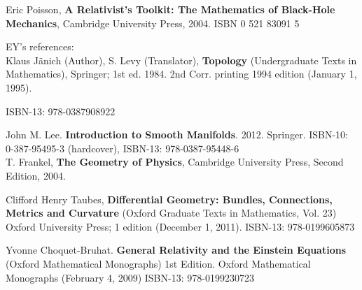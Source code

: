 \documentclass[10pt, twoside]{amsart}
\begin{document}
\begin{thebibliography}{9}
Eric Poisson, 
\textbf{A Relativist's Toolkit: The Mathematics of Black-Hole Mechanics},
Cambridge University Press, 
2004.
ISBN 0 521 83091 5

EY's references: \\

Klaus Jänich (Author), S. Levy (Translator), \textbf{Topology} (Undergraduate Texts in Mathematics), Springer; 1st ed. 1984. 2nd Corr. printing 1994 edition (January 1, 1995).

ISBN-13: 978-0387908922

John M. Lee.  \textbf{Introduction to Smooth Manifolds}.  2012. Springer.   ISBN-10: 0-387-95495-3 (hardcover), ISBN-13: 978-0387-95448-6  \\

T. Frankel,
\textbf{The Geometry of Physics}, 
Cambridge University Press, 
Second Edition,
2004.


Clifford Henry Taubes, \textbf{Differential Geometry: Bundles, Connections, Metrics and Curvature} (Oxford Graduate Texts in Mathematics, Vol. 23) Oxford University Press; 1 edition (December 1, 2011). ISBN-13: 978-0199605873


Yvonne Choquet-Bruhat.  \textbf{General Relativity and the Einstein Equations} (Oxford Mathematical Monographs) 1st Edition.  Oxford Mathematical Monographs (February 4, 2009) ISBN-13: 978-0199230723



\end{thebibliography}
\end{document}

